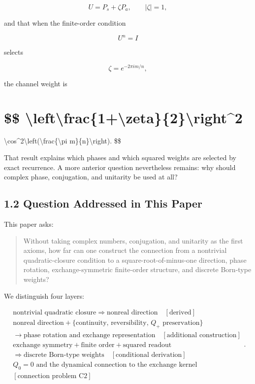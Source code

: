 \documentclass[
  a4paper,
  10pt]{article}
\begin{document}
\[
U=P_s+\zeta P_a,
\qquad |\zeta|=1,
\]

and that when the finite-order condition

\[
U^n=I
\]

selects

\[
\zeta=e^{-2\pi im/n},
\]

the channel weight is

\section{\$\$
\textbackslash left\textbar\textbackslash frac\{1+\textbackslash zeta\}\{2\}\textbackslash right\textbar\^{}2}\label{-leftfrac1zeta2right2}

\textbackslash cos\^{}2\textbackslash left(\textbackslash frac\{\textbackslash pi
m\}\{n\}\textbackslash right). \$\$

That result explains which phases and which squared weights are selected
by exact recurrence. A more anterior question nevertheless remains: why
should complex phase, conjugation, and unitarity be used at all?

\subsection{1.2 Question Addressed in This
Paper}\label{12-question-addressed-in-this-paper}

This paper asks:

\begin{quote}
Without taking complex numbers, conjugation, and unitarity as the first
axioms, how far can one construct the connection from a nontrivial
quadratic-closure condition to a square-root-of-minus-one direction,
phase rotation, exchange-symmetric finite-order structure, and discrete
Born-type weights?
\end{quote}

We distinguish four layers:

\[
\boxed{
\begin{gathered}
\text{nontrivial quadratic closure}
\Rightarrow\text{nonreal direction}
\quad[\text{derived}]\\
\text{nonreal direction}
+\{\text{continuity, reversibility, }Q_+\text{ preservation}\}\\
\longrightarrow\text{phase rotation and exchange representation}
\quad[\text{additional construction}]\\
\text{exchange symmetry}+\text{finite order}+\text{squared readout}\\
\Rightarrow\text{discrete Born-type weights}
\quad[\text{conditional derivation}]\\
Q_0=0\text{ and the dynamical connection to the exchange kernel}\\
[\text{connection problem C2}]
\end{gathered}
}.
\]
\end{document}
